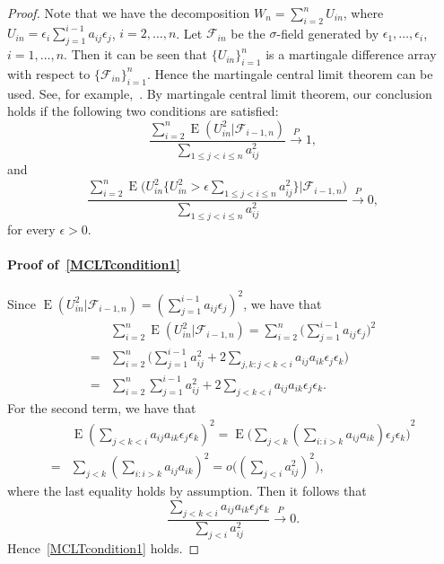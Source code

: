 \documentclass[review]{elsarticle}
\DeclareMathOperator{\myE}{E}
\theoremstyle{plain}
\theoremstyle{definition}
\theoremstyle{remark}
\begin{document}
 \begin{proof}
     Note that we have the decomposition $W_n=\sum_{i=2}^n U_{in}$, where $U_{in} =\epsilon_i \sum_{j=1}^{i-1} a_{ij}\epsilon_j$, $i=2,\ldots,n$.
    Let $\mathcal{F}_{in}$ be the $\sigma$-field generated by $\epsilon_1,\ldots,\epsilon_i$, $i=1,\ldots, n$.
     Then it can be seen that $\{U_{in}\}_{i=1}^n$
       is a martingale difference array with respect to $\{\mathcal{F}_{in}\}_{i=1}^n$. 
     Hence the martingale central limit theorem can be used. See, for example,~\citet[Theorem 1 of Chapter VIII ]{pollard1984convergence}.
     By martingale central limit theorem, our conclusion holds if the following two conditions are satisfied:
     \begin{equation}\label{MCLTcondition1}
         \frac{\sum_{i=2}^n \myE(U_{in}^2 |\mathcal{F}_{i-1,n})}{\sum_{1\leq j<i\leq n} a_{ij}^2}\xrightarrow{P} 1,
     \end{equation}
     and
     \begin{equation}\label{MCLTcondition2}
         \frac{\sum_{i=2}^n \myE\big(U_{in}^2\big\{U_{in}^2>\epsilon \sum_{1\leq j<i\leq n} a_{ij}^2\big\}\big|\mathcal{F}_{i-1,n}\big)}{\sum_{1\leq j<i\leq n} a_{ij}^2}\xrightarrow{P} 0,
     \end{equation}
     for every $\epsilon>0$.

     \paragraph{Proof of~\eqref{MCLTcondition1}}
     Since $\myE(U_{in}^2 |\mathcal{F}_{i-1,n})={(\sum_{j=1}^{i-1}a_{ij}\epsilon_j)}^2$, we have that
     \begin{equation*}
         \begin{aligned}
             &\sum_{i=2}^n \myE(U_{in}^2 |\mathcal{F}_{i-1,n})
             =\sum_{i=2}^n \big(\sum_{j=1}^{i-1}a_{ij}\epsilon_j \big)^2\\
             =&\sum_{i=2}^n \big( \sum_{j=1}^{i-1} a_{ij}^2 +2\sum_{j,k:j<k<i} a_{ij}a_{ik}\epsilon_j \epsilon_k \big)\\
             =&\sum_{i=2}^n  \sum_{j=1}^{i-1} a_{ij}^2 +2\sum_{j<k<i} a_{ij}a_{ik}\epsilon_j \epsilon_k.
         \end{aligned}
     \end{equation*}
     For the second term, we have that
     \begin{equation*}
         \begin{aligned}
             &\myE{(\sum_{j<k<i} a_{ij}a_{ik}\epsilon_j \epsilon_k)}^2
             =
             \myE{\big(\sum_{j<k} (\sum_{i:i>k}a_{ij}a_{ik})\epsilon_j \epsilon_k \big)}^2\\
             =&
             \sum_{j<k} (\sum_{i:i>k}a_{ij}a_{ik})^2
             =
             o\big({(\sum_{j<i} a_{ij}^2)}^2\big),
         \end{aligned}
     \end{equation*}
     where the last equality holds by assumption.
     Then it follows that
     \begin{equation*}
         \frac{\sum_{j<k<i} a_{ij}a_{ik}\epsilon_j \epsilon_k}{\sum_{j<i} a_{ij}^2}\xrightarrow{P} 0.
     \end{equation*}
     Hence~\eqref{MCLTcondition1} holds.

\end{proof}
\end{document}
